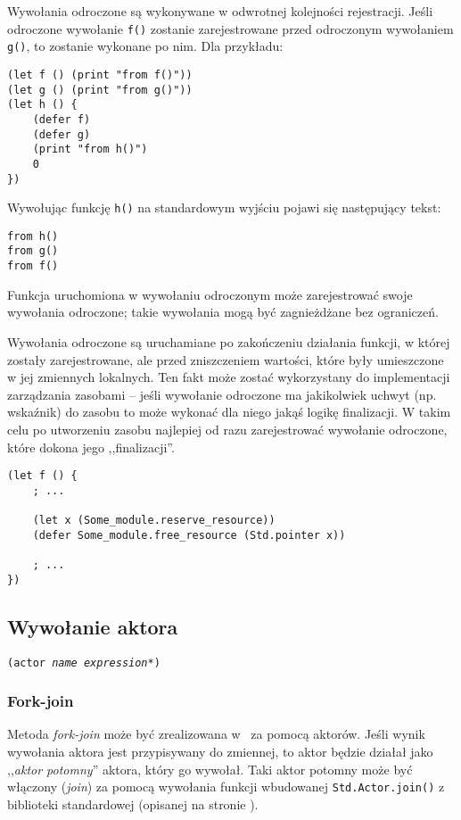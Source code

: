Wywołania odroczone są wykonywane w odwrotnej kolejności rejestracji. Jeśli odroczone wywołanie \texttt{f()}
zostanie zarejestrowane przed odroczonym wywołaniem \texttt{g()}, to zostanie wykonane po nim. Dla przykładu:

\begin{lstlisting}
(let f () (print "from f()"))
(let g () (print "from g()"))
(let h () {
    (defer f)
    (defer g)
    (print "from h()")
    0
})
\end{lstlisting}

Wywołując funkcję \texttt{h()} na standardowym wyjściu pojawi się następujący tekst:

\begin{verbatim}
from h()
from g()
from f()
\end{verbatim}

Funkcja uruchomiona w wywołaniu odroczonym może zarejestrować swoje wywołania odroczone; takie wywołania
mogą być zagnieżdżane bez ograniczeń.

Wywołania odroczone są uruchamiane po zakończeniu działania funkcji, w której zostały zarejestrowane, ale
przed zniszczeniem wartości, które były umieszczone w jej zmiennych lokalnych. Ten fakt może zostać
wykorzystany do implementacji zarządzania zasobami -- jeśli wywołanie odroczone ma jakikolwiek uchwyt (np.
wskaźnik) do zasobu to może wykonać dla niego jakąś logikę finalizacji. W takim celu po utworzeniu zasobu
najlepiej od razu zarejestrować wywołanie odroczone, które dokona jego ,,finalizacji''.

\begin{lstlisting}
(let f () {
    ; ...

    (let x (Some_module.reserve_resource))
    (defer Some_module.free_resource (Std.pointer x))

    ; ...
})
\end{lstlisting}

\subsection{Wywołanie aktora}
\label{viuact_spec_actor_call}

\texttt{(actor \emph{name} \emph{expression}*)}

\subsubsection{Fork-join}

Metoda \emph{fork-join} może być zrealizowana w \ViuAct\ za pomocą aktorów. Jeśli wynik wywołania aktora jest
przypisywany do zmiennej, to aktor będzie działał jako ,,\emph{aktor potomny}'' aktora, który go wywołał. Taki
aktor potomny może być włączony (\emph{join}) za pomocą wywołania funkcji wbudowanej \texttt{Std.Actor.join()}
z biblioteki standardowej (opisanej na stronie \pageref{Std_Actor_join}).

